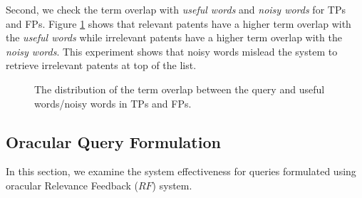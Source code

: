 Second, we check the term overlap with \textit{useful words} and \textit{noisy words} for TPs and FPs. Figure \ref{fig:usefulnoisy} shows that relevant patents have a higher term overlap with the \textit{useful words} while irrelevant patents have a higher term overlap with the \textit{noisy words}. This experiment shows that noisy words mislead the system to retrieve irrelevant patents at top of the list. 
\begin{figure}[t!]
\begin{centering}
 \hspace*{1.5cm}  
\par\end{centering} 
\protect\caption{The distribution of the term overlap between the query and useful words/noisy words in TPs and FPs.}
\label{fig:usefulnoisy}
\end{figure}
\newpage
\subsection{Oracular Query Formulation}
In this section, we examine the system effectiveness for queries formulated using oracular Relevance Feedback ($\mathit{RF}$) system.

